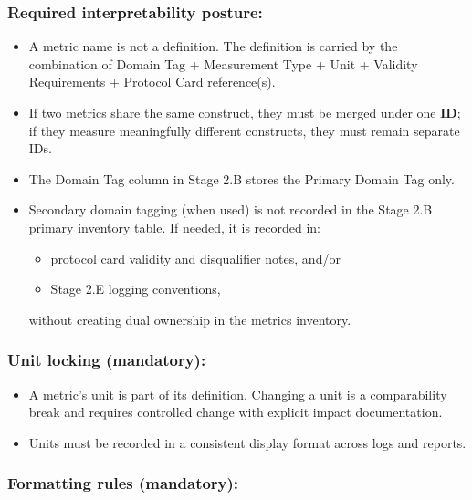 \documentclass[10pt]{article}
\begin{document}
\subsubsection*{Required interpretability posture:}

\begin{itemize}
\item A metric name is not a definition. The definition is carried by the combination of Domain Tag + Measurement Type + Unit + Validity Requirements + Protocol Card reference(s).
\item If two metrics share the same construct, they must be merged under one \textbf{ID}; if they measure meaningfully different constructs, they must remain separate IDs.
\end{itemize}

\begin{itemize}
\item The Domain Tag column in Stage 2.B stores the Primary Domain Tag only.
\item Secondary domain tagging (when used) is not recorded in the Stage 2.B primary inventory table. If needed, it is recorded in:
  \begin{itemize}
  \item protocol card validity and disqualifier notes, and/or
  \item Stage 2.E logging conventions,
  \end{itemize}
  without creating dual ownership in the metrics inventory.
\end{itemize}

\subsubsection*{Unit locking (mandatory):}

\begin{itemize}
\item A metric’s unit is part of its definition. Changing a unit is a comparability break and requires controlled change with explicit impact documentation.
\item Units must be recorded in a consistent display format across logs and reports.
\end{itemize}

\subsubsection*{Formatting rules (mandatory):}
\end{document}
